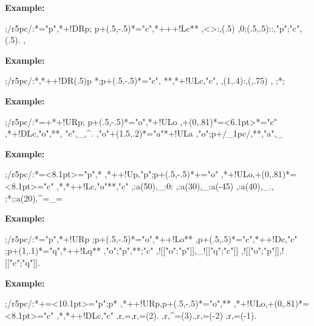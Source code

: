 \documentclass{article}
\newenvironment{code}{\par\noindent\textbf{Example:}\par\noindent}{}
\begin{document}
\begin{code}
;/r5pc/:*\dir{*}="p",*+!DR{p};
p+(.5,-.5)*\dir{*}="c",*+++!L{c}**\dir{-}
,{\ellipse<>{:}},{\ellipse(.5){}}
,0;(.5,.5)::,"p";"c",{\ellipse(.5){.}}
,{\ellipse<5pt>{=}}\endxy
\end{code}
\begin{code}
;/r5pc/:*\dir{*},*++!DR(.5){p}
*\frm{-};p+(.5,-.5)*\dir{*}="c",
**\dir{-},*+!UL{c},"c",
,{\ellipse(1,.4){:}},{\ellipse(,.75){}}
,{\ellipse<15pt,10pt>{=}}
;*{};{}\endxy
\end{code}
\begin{code}
;/r5pc/:*=+\dir{*}*+!UR{p};
p+(.5,-.5)*\dir{*}="o",*+!UL{o}
,+(0,.81)*=<6.1pt>\dir{*}*\frm{-}="c"
,*+!DL{c},"o",**\dir{-},
"c",{\ellipse_{}},{\ellipse^{.}}
%
,"o"+(1.5,.2)*\dir{*}="a"*+!UL{a}
,"o";p+/_1pc/,**{},"a",{\ellipse_{}}
\endxy
\end{code}
\begin{code}
;/r5pc/:*=<8.1pt>\dir{*}="p",*\frm{-}
,*++!U{p},"p";p+(.5,-.5)*+\dir{*}="o"
,*+!UL{o},+(0,.81)*=<8.1pt>\dir{*}="c"
,*\frm{-},*++!L{c},"o"**\dir{-},"c"
,{\ellipse :a(50),_:0{:}}
,{\ellipse :a(30),_:a(-45){}}
,{\ellipse :a(40),_{.}},
;*{};{\ellipse :a(20),^=_{=}}\endxy
\end{code}
\begin{code}
;/r5pc/:*\dir{*}="p",*+!UR{p}
;p+(.5,-.5)*\dir{*}="o",*++!L{o}**\dir{-}
,p+(.5,.5)*\dir{*}="c",*++!D{c},"c"
;p+(1,.1)*\dir{*}="q",*++!L{q}**\dir{-}
,"o";"p",**{};"c"
,{\ellipse![["o";"p"]],_![["q";"c"]]{}}
,{\ellipse![["o";"p"]],![["c";"q"]]{.}}
\endxy
\end{code}
\begin{code}
\xy ;/r5pc/:*+=<10.1pt>\dir{*}="p";p*\frm{-}
,*++!UR{p},p+(.5,-.5)*\dir{*}="o",**\dir{-}
,*+!UL{o},+(0,.81)*=<8.1pt>\dir{*}="c"
,*\frm{-},*++!DL{c},"c"
,{\ellipse r,={}},{\ellipse r,=(2){.}}
,{\ellipse r,^=(3){.}},{\ellipse r,=(-2){}}
,{\ellipse r,=(-1){.}}\endxy
\end{code}
\end{document}
